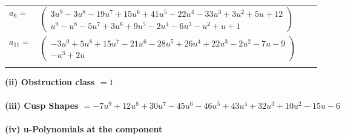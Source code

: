 \documentclass[1p]{elsarticle_modified}
\theoremstyle{definition}
\begin{document}
\begin{tabular}{m{7pt} m{180pt} m{7pt} m{180pt} }
\flushright $a_{6}=$&$\begin{pmatrix}3 u^9-3 u^8-19 u^7+15 u^6+41 u^5-22 u^4-33 u^3+3 u^2+5 u+12\\u^9- u^8-5 u^7+3 u^6+9 u^5-2 u^4-6 u^3- u^2+u+1\end{pmatrix}$ \\
\flushright $a_{11}=$&$\begin{pmatrix}-3 u^9+5 u^8+15 u^7-21 u^6-28 u^5+26 u^4+22 u^3-2 u^2-7 u-9\\- u^3+2 u\end{pmatrix}$\\&\end{tabular}
\flushleft \textbf{(ii) Obstruction class $= 1$}\\~\\
\flushleft \textbf{(iii) Cusp Shapes $= -7 u^9+12 u^8+30 u^7-45 u^6-46 u^5+43 u^4+32 u^3+10 u^2-15 u-6$}\\~\\
\newpage\renewcommand{\arraystretch}{1}
\flushleft \textbf{(iv) u-Polynomials at the component}\newline \\
\end{document}
